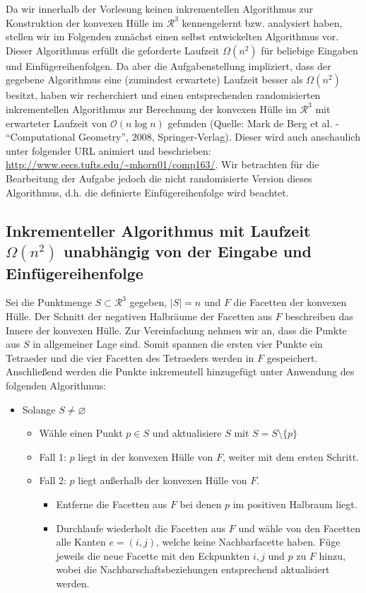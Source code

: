 \documentclass[a4paper]{article}
\begin{document}
Da wir innerhalb der Vorlesung keinen inkrementellen Algorithmus zur Konstruktion der konvexen Hülle im $\mathcal{R}^3$ kennengelernt bzw. analysiert haben,
stellen wir im Folgenden zunächst einen selbst entwickelten Algorithmus vor. Dieser Algorithmus erfüllt die geforderte Laufzeit $\Omega(n^2)$ für beliebige
Eingaben und Einfügereihenfolgen. Da aber die Aufgabenstellung impliziert, dass der gegebene Algorithmus eine (zumindest erwartete) Laufzeit besser als $\Omega(n^2)$
besitzt, haben wir recherchiert und einen entsprechenden randomisierten inkrementellen Algorithmus zur Berechnung der konvexen Hülle im $\mathcal{R}^3$ mit 
erwarteter Laufzeit von $\mathcal{O}(n \log n)$ gefunden (Quelle: Mark de Berg et al. - "`Computational Geometry"', 2008, Springer-Verlag).
Dieser wird auch anschaulich unter folgender URL animiert und beschrieben: \url{http://www.eecs.tufts.edu/~mhorn01/comp163/}. 
Wir betrachten für die Bearbeitung der Aufgabe jedoch die nicht randomisierte Version dieses Algorithmus, d.h. die definierte Einfügereihenfolge
wird beachtet.

\subsection*{Inkrementeller Algorithmus mit Laufzeit $\Omega(n^2)$ unabhängig von der Eingabe und Einfügereihenfolge}
Sei die Punktmenge $S \subset \mathcal{R}^3$ gegeben, $|S| = n$ und $F$ die Facetten der konvexen Hülle. Der Schnitt der negativen Halbräume der Facetten aus $F$ beschreiben das Innere der konvexen Hülle. 
Zur Vereinfachung nehmen wir an, dass die Punkte aus $S$ in allgemeiner Lage sind. Somit spannen die ersten vier Punkte ein Tetraeder und die vier Facetten des Tetraeders werden in $F$ gespeichert. Anschließend werden die Punkte inkrementell hinzugefügt unter Anwendung des folgenden Algorithmus: 

\begin{itemize}
	\item Solange $S \neq \varnothing$
	\begin{itemize}	
		\item Wähle einen Punkt $p \in S$ und aktualisiere $S$ mit $S = S \setminus \{p\}$
		\item Fall 1: $p$ liegt in der konvexen Hülle von $F$, weiter mit dem ersten Schritt.
		\item Fall 2: $p$ liegt außerhalb der konvexen Hülle von $F$.
	\begin{itemize}
		\item Entferne die Facetten aus $F$ bei denen $p$ im positiven Halbraum liegt.
		\item Durchlaufe wiederholt die Facetten aus $F$ und wähle von den Facetten alle Kanten $ e = (i,j) $, welche keine Nachbarfacette haben.
		Füge jeweils die neue Facette mit den Eckpunkten $i,j$ und $p$ zu $F$ hinzu, wobei die Nachbarschaftsbeziehungen entsprechend aktualisiert werden. 
	\end{itemize}
	\end{itemize}
\end{itemize}
\end{document}
